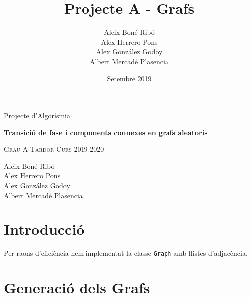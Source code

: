 



%

\title{Projecte A - Grafs}
\author{
Aleix Boné Ribó\\
Alex Herrero Pons\\
Alex González Godoy\\
Albert Mercadé Plasencia\\
}
\date{Setembre 2019}



\thispagestyle{empty}
\clearpage
\setcounter{page}{-1}

\begin{titlepage}
{
    \centering
    \null
    \vfill
    {\Large Projecte d'Algorísmia\par}
    \vspace{2em}
    {\Huge \bfseries 
    Transició de fase i components connexes en grafs aleatoris
    \par}
    \vspace{2em}
    {\large \scshape 
    Grau A \qquad Tardor Curs 2019-2020
    \par}
    \vfill
\begin{center}
    
\end{center}
    \vspace{3cm}

    \vfill
    {\raggedleft \large
Aleix Boné Ribó\\
Alex Herrero Pons\\
Alex González Godoy\\
Albert Mercadé Plasencia\\
        \par}
}
\end{titlepage}

\pagebreak
{} 

\tableofcontents
\pagebreak
{} 

\section{Introducció}
Per raons d'eficiència hem implementat la classe \texttt{Graph} amb llistes d'adjacència. 

\section{Generació dels Grafs}
